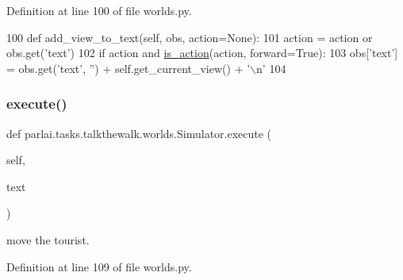 Definition at line 100 of file worlds.\+py.


\begin{DoxyCode}
100     \textcolor{keyword}{def }add\_view\_to\_text(self, obs, action=None):
101         action = action \textcolor{keywordflow}{or} obs.get(\textcolor{stringliteral}{'text'})
102         \textcolor{keywordflow}{if} action \textcolor{keywordflow}{and} \hyperlink{namespaceparlai_1_1tasks_1_1talkthewalk_1_1worlds_aa28536df060005c301225d766f91cb13}{is\_action}(action, forward=\textcolor{keyword}{True}):
103             obs[\textcolor{stringliteral}{'text'}] = obs.get(\textcolor{stringliteral}{'text'}, \textcolor{stringliteral}{''}) + self.get\_current\_view() + \textcolor{stringliteral}{'\(\backslash\)n'}
104 
\end{DoxyCode}
\mbox{\label{classparlai_1_1tasks_1_1talkthewalk_1_1worlds_1_1Simulator_a4e8af8db9b10c3e5c34fdb9004d13694}} 
\subsubsection{\texorpdfstring{execute()}{execute()}}
{\footnotesize\ttfamily def parlai.\+tasks.\+talkthewalk.\+worlds.\+Simulator.\+execute (\begin{DoxyParamCaption}\item[{}]{self,  }\item[{}]{text }\end{DoxyParamCaption})}

\begin{DoxyVerb}move the tourist.
\end{DoxyVerb}
 

Definition at line 109 of file worlds.\+py.


